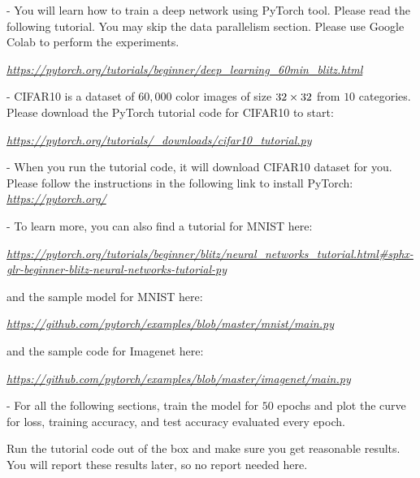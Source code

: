 \documentclass[fleqn]{article}
\begin{document}


- You will learn how to train a deep network using PyTorch tool. Please read the following tutorial. You may skip the data parallelism section. Please use Google Colab to perform the experiments.

\href{https://pytorch.org/tutorials/beginner/deep_learning_60min_blitz.html}{\em https://pytorch.org/tutorials/beginner/deep\_learning\_60min\_blitz.html}

- CIFAR10 is a dataset of $60,000$ color images of size $32\times32\time3$ from $10$ categories. Please download the PyTorch tutorial code for CIFAR10 to start:

\href{https://pytorch.org/tutorials/_downloads/cifar10_tutorial.py}{\em https://pytorch.org/tutorials/\_downloads/cifar10\_tutorial.py}

- When you run the tutorial code, it will download CIFAR10 dataset for you. Please follow the instructions in the following link to install PyTorch:
\href{https://pytorch.org/}{\em https://pytorch.org/}

- To learn more, you can also find a tutorial for MNIST here:

\href{https://pytorch.org/tutorials/beginner/blitz/neural_networks_tutorial.html\#sphx-glr-beginner-blitz-neural-networks-tutorial-py}{\em https://pytorch.org/tutorials/beginner/blitz/neural\_networks\_tutorial.html\#sphx-glr-beginner-blitz-neural-networks-tutorial-py}

and the sample model for MNIST here:

\href{https://github.com/pytorch/examples/blob/master/mnist/main.py}{\em https://github.com/pytorch/examples/blob/master/mnist/main.py}

and the sample code for Imagenet here:

\href{https://github.com/pytorch/examples/blob/master/imagenet/main.py}{\em https://github.com/pytorch/examples/blob/master/imagenet/main.py}

- For all the following sections, train the model for $50$ epochs and plot the curve for loss, training accuracy, and test accuracy evaluated every epoch.

\bee
\item Run the tutorial code out of the box and make sure you get reasonable results. You will report these results later, so no report needed here.
\end{document}
